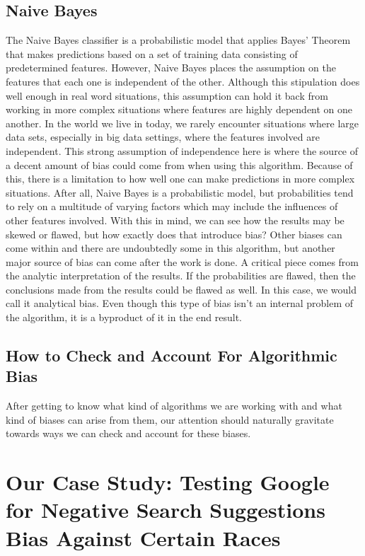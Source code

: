 \documentclass[sigconf]{acmart}
\begin{document}
\subsection{Naive Bayes}

The Naive Bayes classifier is a probabilistic model that applies Bayes' Theorem that makes predictions based on a set of training data consisting of predetermined features. However, Naive Bayes places the assumption on the features that each one is independent of the other. Although this stipulation does well enough in real word situations, this assumption can hold it back from working in more complex situations where features are highly dependent on one another. In the world we live in today, we rarely encounter situations where large data sets, especially in big data settings, where the features involved are independent. This strong assumption of independence here is where the source of a decent amount of bias could come from when using this algorithm. Because of this, there is a limitation to how well one can make predictions in more complex situations. After all, Naive Bayes is a probabilistic model, but probabilities tend to rely on a multitude of varying factors which may include the influences of other features involved.  With this in mind, we can see how the results may be skewed or flawed, but how exactly does that introduce bias? Other biases can come within and there are undoubtedly some in this algorithm, but another major source of bias can come after the work is done. A critical piece comes from the analytic interpretation of the results. If the probabilities are flawed, then the conclusions made from the results could be flawed as well. In this case, we would call it analytical bias. Even though this type of bias isn't an internal problem of the algorithm, it is a byproduct of it in the end result.

\subsection{How to Check and Account For Algorithmic Bias}

After getting to know what kind of algorithms we are working with and what kind of biases can arise from them, our attention should naturally gravitate towards ways we can check and account for these biases. 

\section{Our Case Study: Testing Google for Negative Search Suggestions Bias Against Certain Races}
\end{document}
